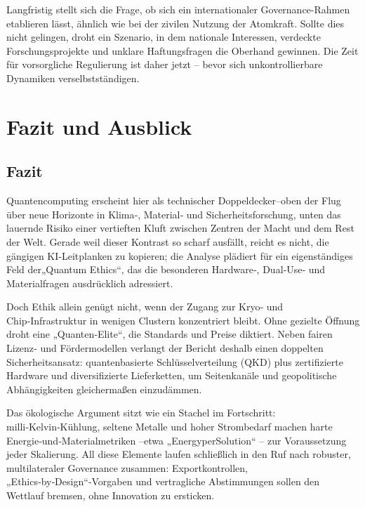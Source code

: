Langfristig stellt sich die Frage, ob sich ein internationaler Governance-Rahmen etablieren lässt, ähnlich wie bei der zivilen Nutzung der Atomkraft. Sollte dies nicht gelingen, droht ein Szenario, in dem nationale Interessen, verdeckte Forschungsprojekte und unklare Haftungsfragen die Oberhand gewinnen. Die Zeit für vorsorgliche Regulierung ist daher jetzt – bevor sich unkontrollierbare Dynamiken verselbstständigen.

 


 

 
 

 

\section{Fazit und Ausblick}
\subsection{Fazit}


Quantencomputing erscheint hier als technischer Doppeldecker–oben der Flug über neue Horizonte in Klima‑, Material‑ und Sicherheitsforschung, unten das lauernde Risiko einer vertieften Kluft zwischen Zentren der Macht und dem Rest der Welt. Gerade weil dieser Kontrast so scharf ausfällt, reicht es nicht, die gängigen KI‑Leitplanken zu kopieren; die Analyse plädiert für ein eigenständiges Feld der„Quantum Ethics“, das die besonderen Hardware‑, Dual‑Use‑ und Materialfragen ausdrücklich adressiert.

Doch Ethik allein genügt nicht, wenn der Zugang zur Kryo‑ und Chip‑Infrastruktur in wenigen Clustern konzentriert bleibt. Ohne gezielte Öffnung droht eine „Quanten‑Elite“, die Standards und Preise diktiert. Neben fairen Lizenz‑ und Fördermodellen verlangt der Bericht deshalb einen doppelten Sicherheitsansatz: quantenbasierte Schlüsselverteilung (QKD) plus zertifizierte Hardware und diversifizierte Lieferketten, um Seitenkanäle und geopolitische Abhängigkeiten gleichermaßen einzudämmen.

Das ökologische Argument sitzt wie ein Stachel im Fortschritt: milli‑Kelvin‑Kühlung, seltene Metalle und hoher Strombedarf machen harte Energie‑und‑Materialmetriken –etwa „EnergyperSolution“ – zur Voraussetzung jeder Skalierung. All diese Elemente laufen schließlich in den Ruf nach robuster, multilateraler Governance zusammen: Exportkontrollen, „Ethics‑by‑Design“‑Vorgaben und vertragliche Abstimmungen sollen den Wettlauf bremsen, ohne Innovation zu ersticken.

